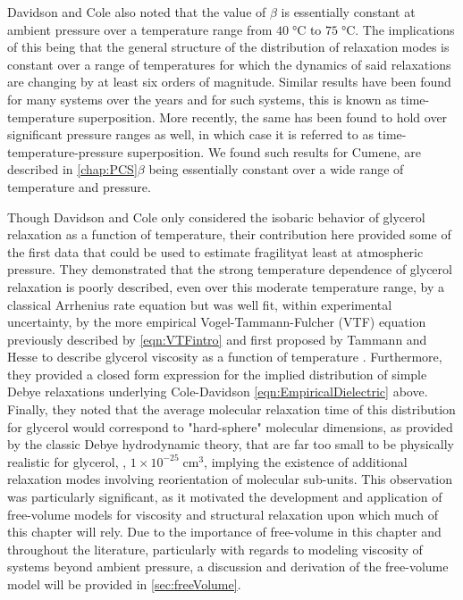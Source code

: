 Davidson and Cole  also noted that the value of $\beta$ is essentially constant at ambient pressure over a temperature range from $40\;\si{\degreeCelsius}$ to $75\;\si{\degreeCelsius}$.  The implications of this being that the general structure of the distribution of relaxation modes is constant over a range of temperatures for which the dynamics of said relaxations are changing by at least six orders of magnitude.   Similar results have been found for many systems over the years and for such systems, this is known as time-temperature superposition.  More recently, the same has been found to hold over significant pressure ranges as well, in which case it is referred to as time-temperature-pressure superposition.  We found such results for Cumene, are described in \chap\nolinebreak \ref{chap:PCS}\textemdash$\beta$ being essentially constant over a wide range of temperature and pressure.

Though Davidson and Cole only considered the isobaric behavior of glycerol relaxation as a function of temperature, their contribution here provided some of the first data that could be used to estimate fragility\textemdash at least at atmospheric pressure. They demonstrated that the strong temperature dependence of glycerol relaxation is poorly described, even over this moderate temperature range, by a classical Arrhenius rate equation but was well fit, within experimental uncertainty, by the more empirical Vogel-Tammann-Fulcher (VTF) equation previously described by \eqn \ref{eqn:VTFintro} and first proposed by Tammann and Hesse to describe glycerol viscosity as a function of temperature \nolinebreak \cite{Tammann}.  Furthermore, they provided a closed form expression for the implied distribution of simple Debye relaxations underlying Cole-Davidson \eqn\nolinebreak \ref{eqn:EmpiricalDielectric} above.  Finally, they noted that the average molecular relaxation time of this distribution for glycerol would correspond to "hard-sphere" molecular dimensions, as provided by the classic Debye hydrodynamic theory, that are far too small to be physically realistic for glycerol, \eg, $1\times10^{-25}\;\si{\centi\meter\cubed}$, implying the existence of additional relaxation modes involving reorientation of molecular sub-units.  This observation was particularly significant, as it motivated the development and application of free-volume models for viscosity and structural relaxation upon which much of this chapter will rely.  Due to the importance of free-volume in this chapter and throughout the literature, particularly with regards to modeling viscosity of systems beyond ambient pressure, a discussion and derivation of the free-volume model will be provided in \sect\nolinebreak \ref{sec:freeVolume}.

